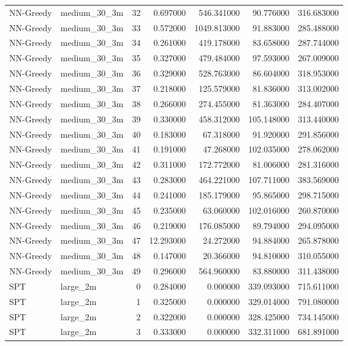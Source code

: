 \begin{tabular}{llrrrrr}
NN-Greedy & medium_30_3m & 32 & 0.697000 & 546.341000 & 90.776000 & 316.683000 \\
NN-Greedy & medium_30_3m & 33 & 0.572000 & 1049.813000 & 91.883000 & 285.488000 \\
NN-Greedy & medium_30_3m & 34 & 0.261000 & 419.178000 & 83.658000 & 287.744000 \\
NN-Greedy & medium_30_3m & 35 & 0.327000 & 479.484000 & 97.593000 & 267.009000 \\
NN-Greedy & medium_30_3m & 36 & 0.329000 & 528.763000 & 86.604000 & 318.953000 \\
NN-Greedy & medium_30_3m & 37 & 0.218000 & 125.579000 & 81.836000 & 313.002000 \\
NN-Greedy & medium_30_3m & 38 & 0.266000 & 274.455000 & 81.363000 & 284.407000 \\
NN-Greedy & medium_30_3m & 39 & 0.330000 & 458.312000 & 105.148000 & 313.440000 \\
NN-Greedy & medium_30_3m & 40 & 0.183000 & 67.318000 & 91.920000 & 291.856000 \\
NN-Greedy & medium_30_3m & 41 & 0.191000 & 47.268000 & 102.035000 & 278.062000 \\
NN-Greedy & medium_30_3m & 42 & 0.311000 & 172.772000 & 81.006000 & 281.316000 \\
NN-Greedy & medium_30_3m & 43 & 0.283000 & 464.221000 & 107.711000 & 383.569000 \\
NN-Greedy & medium_30_3m & 44 & 0.241000 & 185.179000 & 95.865000 & 298.715000 \\
NN-Greedy & medium_30_3m & 45 & 0.235000 & 63.060000 & 102.016000 & 260.870000 \\
NN-Greedy & medium_30_3m & 46 & 0.219000 & 176.085000 & 89.794000 & 294.095000 \\
NN-Greedy & medium_30_3m & 47 & 12.293000 & 24.272000 & 94.884000 & 265.878000 \\
NN-Greedy & medium_30_3m & 48 & 0.147000 & 20.366000 & 94.810000 & 310.055000 \\
NN-Greedy & medium_30_3m & 49 & 0.296000 & 564.960000 & 83.880000 & 311.438000 \\
SPT & large_2m & 0 & 0.284000 & 0.000000 & 339.093000 & 715.611000 \\
SPT & large_2m & 1 & 0.325000 & 0.000000 & 329.014000 & 791.080000 \\
SPT & large_2m & 2 & 0.322000 & 0.000000 & 328.425000 & 734.145000 \\
SPT & large_2m & 3 & 0.333000 & 0.000000 & 332.311000 & 681.891000 \\

\end{tabular}
